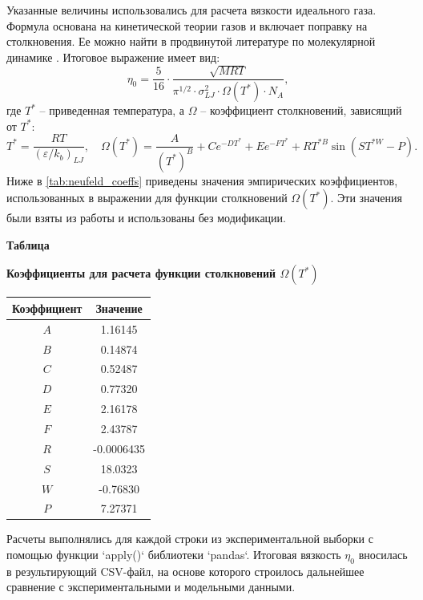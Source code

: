 \documentclass[a4paper,12pt]{article}
\newcommand{\TableNumberRight}{
  \refstepcounter{table}%
  \noindent\hfill\textbf{Таблица \thetable}
}
\begin{document}
      Указанные величины использовались для расчета вязкости идеального газа. Формула основана на кинетической теории газов и включает поправку на столкновения. Ее можно найти в продвинутой литературе по молекулярной динамике \cite{голубев2013вязкость}. Итоговое выражение имеет вид:
      \[
        \eta_0 = \frac{5}{16} \cdot \frac{\sqrt{MRT}}{\pi^{1/2} \cdot \sigma_{LJ}^2 \cdot \Omega(T^*) \cdot N_A},
      \]
      где $T^*$ -- приведенная температура, а $\Omega$ -- коэффициент столкновений, зависящий от $T^*$:
      \[
        T^* = \frac{RT}{(\varepsilon/k_b)_{LJ}}, \quad
      \Omega(T^*) = \frac{A}{(T^*)^B} + C e^{-D T^*} + E e^{-F T^*} + R T^{*B} \sin(S T^{*W} - P).
      \]
      Ниже в \autoref{tab:neufeld_coeffs} приведены значения эмпирических коэффициентов, использованных в выражении для функции столкновений $\Omega(T^*)$. Эти значения были взяты из работы \cite{neufeld1972collision} и использованы без модификации. 
      \begin{table}[ht]
        \TableNumberRight
        \begin{center}
          \textbf{Коэффициенты для расчета функции столкновений $\Omega(T^*)$}
          \vspace*{\fill}
        \end{center}
      
        \vspace{0.8ex}
        \noindent
        \begin{tabular}{|c|S|}
          \hline
          \textbf{Коэффициент} & {\textbf{Значение}} \\
          \hline
          $A$ & 1.16145 \\
          $B$ & 0.14874 \\
          $C$ & 0.52487 \\
          $D$ & 0.77320 \\
          $E$ & 2.16178 \\
          $F$ & 2.43787 \\
          $R$ & -0.0006435 \\
          $S$ & 18.0323 \\
          $W$ & -0.76830 \\
          $P$ & 7.27371 \\
          \hline
        \end{tabular}
        \label{tab:neufeld_coeffs}
      \end{table}
      
      Расчеты выполнялись для каждой строки из экспериментальной выборки с помощью функции `apply()` библиотеки `pandas`. Итоговая вязкость $\eta_0$ вносилась в результирующий CSV-файл, на основе которого строилось дальнейшее сравнение с экспериментальными и модельными данными.      
      
\end{document}
